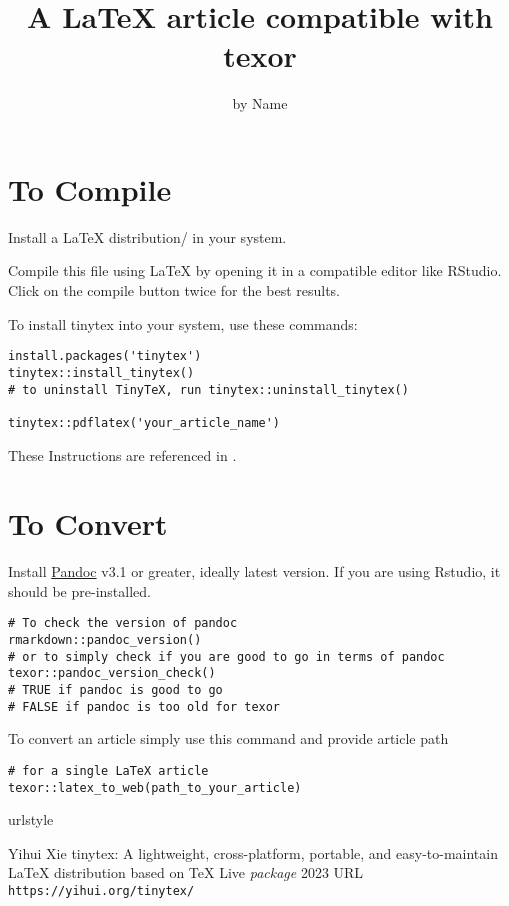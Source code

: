 \title{A LaTeX article compatible with texor}
\author{by Name}

\maketitle


\section{To Compile}

Install a LaTeX distribution/ in your system.

Compile this file using LaTeX by opening it in a compatible editor like RStudio.
Click on the compile button twice  for the best results.

To install tinytex into your system, use these commands:
\begin{verbatim}
install.packages('tinytex')
tinytex::install_tinytex()
# to uninstall TinyTeX, run tinytex::uninstall_tinytex()

tinytex::pdflatex('your_article_name')
\end{verbatim}
These Instructions are referenced in \citep{tinytex}.


\section{To Convert}

Install \href{https://pandoc.org/installing.html}{Pandoc} v3.1 or greater, ideally latest version. If you are using
Rstudio, it should be pre-installed.

\begin{verbatim}
# To check the version of pandoc
rmarkdown::pandoc_version()
# or to simply check if you are good to go in terms of pandoc
texor::pandoc_version_check()
# TRUE if pandoc is good to go
# FALSE if pandoc is too old for texor
\end{verbatim}

To convert an article simply use this command and provide article path

\begin{verbatim}
# for a single LaTeX article
texor::latex_to_web(path_to_your_article)
\end{verbatim}

\begin{thebibliography}{99}
    \providecommand{\natexlab}[1]{#1}
    \providecommand{\url}[1]{\texttt{#1}}
    \expandafter\ifx\csname urlstyle\endcsname\relax
      \providecommand{\doi}[1]{doi: #1}\else
      \providecommand{\doi}{doi: \begingroup \urlstyle{rm}\Url}\fi

Yihui Xie
\newblock tinytex: A lightweight, cross-platform, portable, and easy-to-maintain LaTeX distribution based on TeX Live
\newblock \emph{package}  2023
\newblock URL \url{https://yihui.org/tinytex/}

\end{thebibliography}


\address{%
Name\\
Dept,Org,Post\\%
City, Country\\
ORCiD: 0000-0000-0000-0000\\
}
